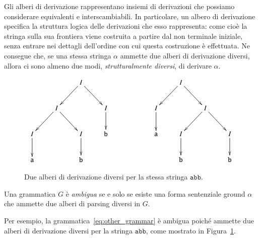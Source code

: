 Gli alberi di derivazione rappresentano insiemi di derivazioni che possiamo
considerare equivalenti e interscambiabili. In particolare,
un albero di derivazione
specifica la struttura logica delle derivazioni che esso rappresenta:
come cio\`e la stringa sulla sua frontiera viene costruita
a partire dal non terminale iniziale, senza entrare nei dettagli dell'ordine
con cui questa costruzione \`e effettuata. Ne consegue che, se una stessa
stringa $\alpha$ ammette due alberi di derivazione diversi, allora
ci sono almeno due modi, \emph{strutturalmente diversi}, di derivare $\alpha$.
%
\begin{figure}[t]
\[
\xymatrix{
   &   & I\ar[ld]\ar[rd] \\
   & I\ar[ld]\ar[rd] &   & I\ar[d]\\
 I\ar[d] &   & I\ar[d] & \mathtt{b}\\
 \mathtt{a} & & \mathtt{b}
}
\qquad\qquad\qquad
\xymatrix{
  & I\ar[ld]\ar[rd] \\
I\ar[d] &   & I\ar[ld]\ar[rd]\\
\mathtt{a} & I\ar[d] &  & I\ar[d]\\
  & \mathtt{b} &  & \mathtt{b}
}
\]
\caption{Due alberi di derivazione diversi per la stessa stringa $\mathtt{abb}$.}\label{fig:ambiguity}
\end{figure}
%
\begin{definition}\label{def:ambiguity}
Una grammatica $G$ \`e \emph{ambigua} se e solo se esiste una forma
sentenziale ground $\alpha$ che ammette due alberi di parsing diversi in $G$.
\end{definition}
%
\noindent
Per esempio, la grammatica~\eqref{eq:other_grammar} \`e ambigua poich\'e
ammette due alberi di derivazione diversi per la stringa
$\mathtt{abb}$, come mostrato in Figura~\ref{fig:ambiguity}.

